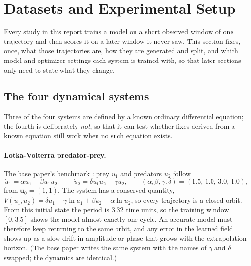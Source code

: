 \section{Datasets and Experimental Setup}
\label{sec:setup}

Every study in this report trains a model on a short observed window of one
trajectory and then scores it on a later window it never saw. This section
fixes, once, what those trajectories are, how they are generated and split,
and which model and optimizer settings each system is trained with, so that
later sections only need to state what they change.

\subsection{The four dynamical systems}

Three of the four systems are defined by a known ordinary differential
equation; the fourth is deliberately \emph{not}, so that it can test whether
fixes derived from a known equation still work when no such equation exists.

\paragraph{Lotka-Volterra predator-prey.} The base paper's benchmark
\cite{koenig2024kanode}: prey $u_1$ and predators $u_2$ follow
\begin{equation}
\dot u_1 = \alpha u_1 - \beta u_1 u_2, \qquad
\dot u_2 = \delta u_1 u_2 - \gamma u_2,
\qquad (\alpha,\beta,\gamma,\delta)=(1.5,\,1.0,\,3.0,\,1.0),
\label{eq:lv}
\end{equation}
from $\mathbf{u}_0=(1,1)$. The system has a conserved quantity,
$V(u_1,u_2)=\delta u_1-\gamma\ln u_1+\beta u_2-\alpha\ln u_2$, so every
trajectory is a closed orbit. From this initial state the period is $3.32$
time units, so the training window $[0,3.5]$ shows the model almost exactly
one cycle. An accurate model must therefore keep returning to the
same orbit, and any error in the learned field shows up as a slow drift in
amplitude or phase that grows with the extrapolation horizon. (The base paper
writes the same system with the names of $\gamma$ and $\delta$ swapped; the
dynamics are identical.)

